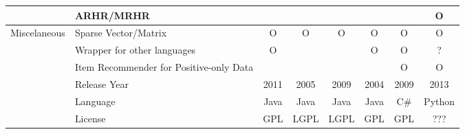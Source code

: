 {\begin{tabular}{c|l|cccccc}
                                         &ARHR/MRHR&&&&&&O\\ \midrule
    \multirow{6}{*}{Miscelaneous}        &Sparse Vector/Matrix&O&O&O&O&O&O\\
                                         &Wrapper for other languages&O&&&O&O&?\\
                                         &Item Recommender for Positive-only Data&&&&&O&O\\
                                         &Release Year&2011&2005&2009&2004&2009&2013\\
                                         &Language&Java&Java&Java&Java&C\#&Python\\
                                         &License&GPL&LGPL&LGPL&GPL&GPL&???\\ \bottomrule
    
\end{tabular}}

